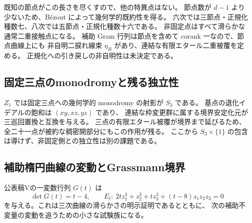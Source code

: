 既知の節点がこの長さを尽くすので、他の特異点はない。
節点数が $d-1$ より少ないため、B\'ezout によって幾何学的既約性を得る。
六次では三節点・正規化種数七、八次では五節点・正規化種数十六である。
非固定点はすべて滑らかな通常二重接触点になる。
補助 Gram 行列は節点を含めて corank 一なので、節点曲線上にも
非自明二捩れ線束 $\eta_B$ があり、連結な有限エタール二重被覆を定める。
正規化への引き戻しの非自明性は未決定である。

\subsection{固定三点のmonodromyと残る独立性}
$Z_1$ では固定三点への幾何学的 monodromy の射影が $S_3$ である。
基点の退化イデアルの飽和は $(xy,xz,yz)$ であり、
連結な枠変更群に属する境界安定化元が三巡回置換と互換を与える。
三点の有限エタール被覆が境界まで延びるため、全二十一点が被約な稠密開部分にもこの作用が残る。
ここから $S_3\times\{1\}$ の包含は導けず、非固定側との独立性は別の課題である。

\subsection{補助楕円曲線の変動とGrassmann境界}
公表稿Vの一変数行列 $G(t)$ は
\[
 \det G(t)=t-4,\qquad
 E_t:\ 2tz_1^3+z_2^3+tz_3^3+(t-8)z_1z_2z_3=0
\]
を与える。これは三次曲線の滑らかさの明示証明であるとともに、
次の補助不変量の変動を追うための小さな試験族になる。


